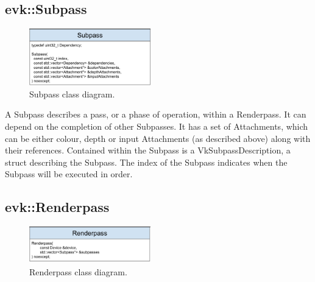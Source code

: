 \documentclass[12pt]{report}
\newcommand{\figurewidth}{0.55\textwidth}
\newcommand{\imagewidth}{0.47\textwidth}
\theoremstyle{definition}
\begin{document}
      \subsection{evk::Subpass}

        \begin{figure}
          \centering
          \includegraphics[width=\imagewidth]{images/class_subpass.png}
          \caption{Subpass class diagram.}
          \label{fig:class_subpass}
        \end{figure}

        A Subpass describes a pass, or a phase of operation, within a
        Renderpass. It can depend on the completion of other Subpasses.
        It has a set of Attachments, which can be either colour, depth or
        input Attachments (as described above) along with their references.
        Contained within the Subpass is a VkSubpassDescription, a struct
        describing the Subpass. The index of the Subpass indicates when the
        Subpass will be executed in order.

      \subsection{evk::Renderpass}

        \begin{figure}
          \centering
          \includegraphics[width=\imagewidth]{images/class_renderpass.png}
          \caption{Renderpass class diagram.}
          \label{fig:class_renderpass}
        \end{figure}
\end{document}
